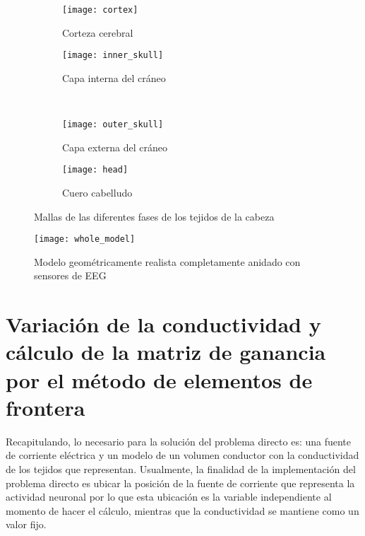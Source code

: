 \begin{figure}[tb]
	\centering
	\begin{subfigure}{0.45\textwidth}
		\texttt{[image: cortex]}
		\caption{Corteza cerebral}
		\label{fig:methodology:cortex}
		\vspace{0.1cm}
	\end{subfigure}\hfill
	\begin{subfigure}{0.45\textwidth}
		\texttt{[image: inner\_skull]}
		\caption{Capa interna del cráneo}
		\label{fig:methodology:inner}
		\vspace{0.1cm}
	\end{subfigure}\\
	\begin{subfigure}{0.45\textwidth}
		\texttt{[image: outer\_skull]}
		\caption{Capa externa del cráneo}
		\label{fig:methodology:outer}
	\end{subfigure}\hfill
	\begin{subfigure}{0.45\textwidth}
		\texttt{[image: head]}
		\caption{Cuero cabelludo}
		\label{fig:methodology:head}
	\end{subfigure}
	\caption{Mallas de las diferentes fases de los tejidos de la cabeza}
	\label{fig:methodology:meshes}
\end{figure}



\begin{figure}[htb]
	\texttt{[image: whole\_model]}
	\caption{Modelo geométricamente realista completamente anidado con sensores de EEG}
	\label{fig:methodology:model}
\end{figure}


\section{Variación de la conductividad y cálculo de la matriz de ganancia por el método de elementos de frontera}
\label{sec:methodology:openmeeg}

Recapitulando, lo necesario para la solución del problema directo es: una fuente de corriente eléctrica y un modelo de un volumen conductor con la conductividad de los tejidos que representan. Usualmente, la finalidad de la implementación del problema directo es ubicar la posición de la fuente de corriente que representa la actividad neuronal por lo que esta ubicación es la variable independiente al momento de hacer el cálculo, mientras que la conductividad se mantiene como un valor fijo.

